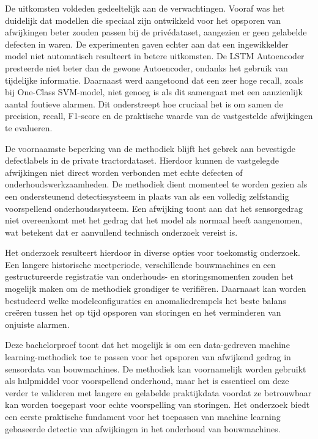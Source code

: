De uitkomsten  voldeden gedeeltelijk aan de verwachtingen. Vooraf was het duidelijk dat modellen die speciaal zijn ontwikkeld voor het opsporen van afwijkingen beter zouden passen bij de privédataset, aangezien er geen gelabelde defecten in waren. De experimenten gaven echter aan dat een ingewikkelder model niet automatisch resulteert in betere uitkomsten. De LSTM Autoencoder presteerde niet beter dan de gewone Autoencoder, ondanks het gebruik van tijdelijke informatie. Daarnaast werd aangetoond dat een zeer hoge recall, zoals bij One-Class SVM-model, niet genoeg is als dit samengaat met een aanzienlijk aantal foutieve alarmen. Dit onderstreept hoe cruciaal het is om samen de precision, recall, F1-score en de praktische waarde van de vastgestelde afwijkingen te evalueren.

De voornaamste beperking van de methodiek blijft het gebrek aan bevestigde defectlabels in de private tractordataset. Hierdoor kunnen de vastgelegde afwijkingen niet direct worden verbonden met echte defecten of onderhoudswerkzaamheden. De methodiek dient momenteel te worden gezien als een ondersteunend detectiesysteem in plaats van als een volledig zelfstandig voorspellend onderhoudssysteem. Een afwijking toont aan dat het sensorgedrag niet overeenkomt met het gedrag dat het model als normaal heeft aangenomen, wat betekent dat er aanvullend technisch onderzoek vereist is.

Het onderzoek resulteert hierdoor in diverse opties voor toekomstig onderzoek. Een langere historische meetperiode, verschillende bouwmachines en een gestructureerde registratie van onderhouds- en storingsmomenten zouden het mogelijk maken om de methodiek grondiger te verifiëren. Daarnaast kan worden bestudeerd welke modelconfiguraties en anomaliedrempels het beste balans creëren tussen het op tijd opsporen van storingen en het verminderen van onjuiste alarmen.

Deze bachelorproef toont dat het mogelijk is om een data-gedreven machine lear\-ning-methodiek toe te passen voor het opsporen van afwijkend gedrag in sensordata van bouwmachines. De methodiek kan voornamelijk worden gebruikt als hulpmiddel voor voorspellend onderhoud, maar het is essentieel om deze verder te valideren met langere en gelabelde praktijkdata voordat ze betrouwbaar kan worden toegepast voor echte voorspelling van storingen. Het onderzoek biedt een eerste praktische fundament voor het toepassen van machine learning gebaseerde detectie van afwijkingen in het onderhoud van bouwmachines.









